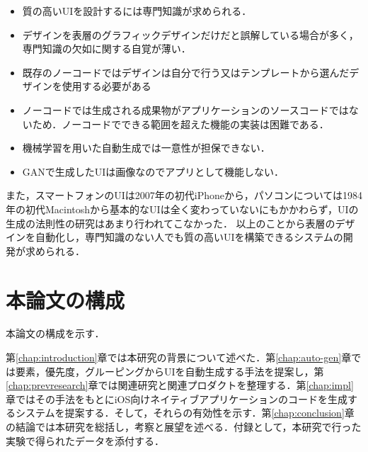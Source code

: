\begin{itemize}
	\item 質の高いUIを設計するには専門知識が求められる．
	\item デザインを表層のグラフィックデザインだけだと誤解している場合が多く，専門知識の欠如に関する自覚が薄い．
	\item 既存のノーコードではデザインは自分で行う又はテンプレートから選んだデザインを使用する必要がある
	\item ノーコードでは生成される成果物がアプリケーションのソースコードではないため．ノーコードでできる範囲を超えた機能の実装は困難である．
	\item 機械学習を用いた自動生成では一意性が担保できない．
	\item GANで生成したUIは画像なのでアプリとして機能しない．
\end{itemize}
また，スマートフォンのUIは2007年の初代iPhoneから，パソコンについては1984年の初代Macintoshから基本的なUIは全く変わっていないにもかかわらず，UIの生成の法則性の研究はあまり行われてこなかった．
以上のことから表層のデザインを自動化し，専門知識のない人でも質の高いUIを構築できるシステムの開発が求められる．


\section{本論文の構成}

本論文の構成を示す．

第\ref{chap:introduction}章では本研究の背景について述べた．第\ref{chap:auto-gen}章では要素，優先度，グルーピングからUIを自動生成する手法を提案し，第\ref{chap:prevresearch}章では関連研究と関連プロダクトを整理する．第\ref{chap:impl}章ではその手法をもとにiOS向けネイティブアプリケーションのコードを生成するシステムを提案する．そして，それらの有効性を示す．第\ref{chap:conclusion}章の結論では本研究を総括し，考察と展望を述べる．付録として，本研究で行った実験で得られたデータを添付する．
